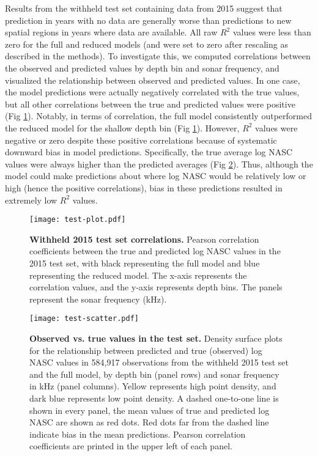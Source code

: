 \documentclass[10pt,letterpaper]{article}
\begin{document}
Results from the withheld test set containing data from 2015 suggest that prediction in years with no data are generally worse than predictions to new spatial regions in years where data are available. 
All raw $R^2$ values were less than zero for the full and reduced models (and were set to zero after rescaling as described in the methods).
To investigate this, we computed correlations between the observed and predicted values by depth bin and sonar frequency, and visualized the relationship between observed and predicted values. 
In one case, the model predictions were actually negatively correlated with the true values, but all other correlations between the true and predicted values were positive (Fig \ref{fig:fig4}). 
Notably, in terms of correlation, the full model consistently outperformed the reduced model for the shallow depth bin (Fig \ref{fig:fig4}).
However, $R^2$ values were negative or zero despite these positive correlations because of systematic downward bias in model predictions. 
Specifically, the true average log NASC values were always higher than the predicted averages (Fig \ref{fig:fig5}).
Thus, although the model could make predictions about where log NASC would be relatively low or high (hence the positive correlations), bias in these predictions resulted in extremely low $R^2$ values. 

\begin{figure}[ht]
    \centering
    \texttt{[image: test-plot.pdf]}
    \caption{{\bf Withheld 2015 test set correlations.} Pearson correlation coefficients between the true and predicted log NASC values in the 2015 test set, with black representing the full model and blue representing the reduced model. The x-axis represents the correlation values, and the y-axis represents depth bins. The panels represent the sonar frequency (kHz).}
    \label{fig:fig4}
\end{figure}

\begin{figure}[ht]
    \centering
    \texttt{[image: test-scatter.pdf]}
    \caption{{\bf Observed vs. true values in the test set.} Density surface plots for the relationship between predicted and true (observed) log NASC values in 584,917 observations from the withheld 2015 test set and the full model, by depth bin (panel rows) and sonar frequency in kHz (panel columns). Yellow represents high point density, and dark blue represents low point density. A dashed one-to-one line is shown in every panel, the mean values of true and predicted log NASC are shown as red dots. Red dots far from the dashed line indicate bias in the mean predictions. Pearson correlation coefficients are printed in the upper left of each panel.}
    \label{fig:fig5}
\end{figure}
\end{document}

